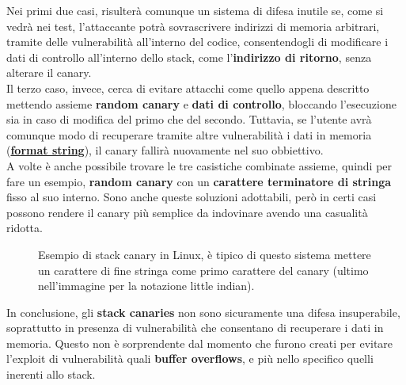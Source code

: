 Nei primi due casi, risulterà comunque un sistema di difesa inutile se, come si vedrà nei test, l'attaccante potrà sovrascrivere indirizzi di memoria arbitrari, tramite delle vulnerabilità all'interno del codice, consentendogli di modificare i dati di controllo all'interno dello stack, come l'\textbf{indirizzo di ritorno}, senza alterare il canary.\\
Il terzo caso, invece, cerca di evitare attacchi come quello appena descritto mettendo assieme \textbf{random canary} e \textbf{dati di controllo}, bloccando l'esecuzione sia in caso di modifica del primo che del secondo. Tuttavia, se l'utente avrà comunque modo di recuperare tramite altre vulnerabilità i dati in memoria (\hyperref[subsec:format string]{\textbf{format string}}), il canary fallirà nuovamente nel suo obbiettivo.\\
A volte è anche possibile trovare le tre casistiche combinate assieme, quindi per fare un esempio, \textbf{random canary} con un \textbf{carattere terminatore di stringa} fisso al suo interno. Sono anche queste soluzioni adottabili, però in certi casi possono rendere il canary più semplice da indovinare avendo una casualità ridotta.\\
\begin{figure}[ht]
    \centerline{}
    \caption{Esempio di stack canary in Linux, è tipico di questo sistema mettere un carattere di fine stringa come primo carattere del canary (ultimo nell'immagine per la notazione little indian).}
    \label{fig:canary-stack}
\end{figure}
In conclusione, gli \textbf{stack canaries} non sono sicuramente una difesa insuperabile, soprattutto in presenza di vulnerabilità che consentano di recuperare i dati in memoria. Questo non è sorprendente dal momento che furono creati per evitare l'exploit di vulnerabilità quali \textbf{buffer overflows}, e più nello specifico quelli inerenti allo stack. \cite*{Canary}

